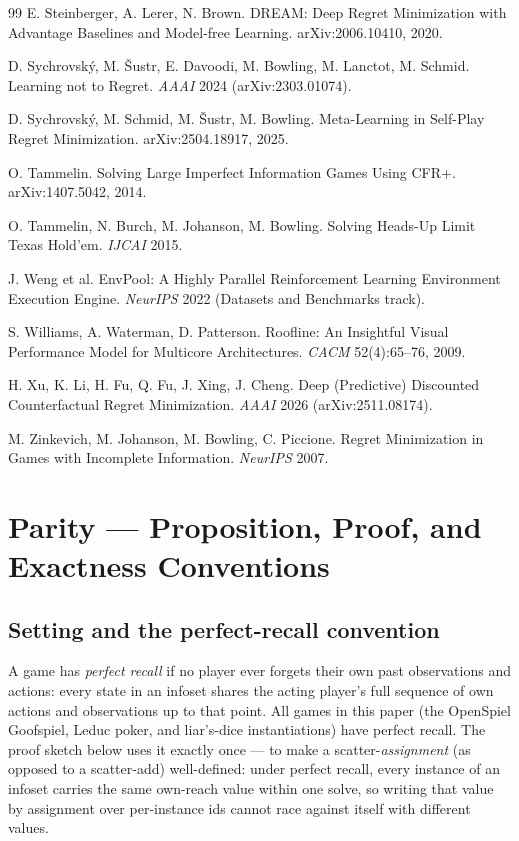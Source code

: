 \documentclass[11pt]{article}
\begin{document}
\begin{thebibliography}{99}
 E. Steinberger, A. Lerer, N. Brown. DREAM: Deep Regret
Minimization with Advantage Baselines and Model-free Learning. arXiv:2006.10410, 2020.

 D. Sychrovský, M. Šustr, E. Davoodi, M. Bowling, M. Lanctot,
M. Schmid. Learning not to Regret. \emph{AAAI} 2024 (arXiv:2303.01074).

 D. Sychrovský, M. Schmid, M. Šustr, M. Bowling. Meta-Learning in
Self-Play Regret Minimization. arXiv:2504.18917, 2025.

 O. Tammelin. Solving Large Imperfect Information Games Using
CFR+. arXiv:1407.5042, 2014.

 O. Tammelin, N. Burch, M. Johanson, M. Bowling. Solving Heads-Up
Limit Texas Hold'em. \emph{IJCAI} 2015.

 J. Weng et al. EnvPool: A Highly Parallel Reinforcement Learning
Environment Execution Engine. \emph{NeurIPS} 2022 (Datasets and Benchmarks track).

 S. Williams, A. Waterman, D. Patterson. Roofline: An Insightful
Visual Performance Model for Multicore Architectures. \emph{CACM} 52(4):65--76, 2009.

 H. Xu, K. Li, H. Fu, Q. Fu, J. Xing, J. Cheng. Deep
(Predictive) Discounted Counterfactual Regret Minimization. \emph{AAAI} 2026
(arXiv:2511.08174).

 M. Zinkevich, M. Johanson, M. Bowling, C. Piccione. Regret
Minimization in Games with Incomplete Information. \emph{NeurIPS} 2007.

\end{thebibliography}


\appendix

\section{Parity --- Proposition, Proof, and Exactness Conventions}

\subsection{Setting and the perfect-recall convention}

A game has \emph{perfect recall} if no player ever forgets their own past observations
and actions: every state in an infoset shares the acting player's full sequence of own
actions and observations up to that point. All games in this paper (the OpenSpiel
Goofspiel, Leduc poker, and liar's-dice instantiations) have perfect recall. The proof
sketch below uses it exactly once --- to make a scatter-\emph{assignment} (as opposed to
a scatter-add) well-defined: under perfect recall, every instance of an infoset carries
the same own-reach value within one solve, so writing that value by assignment over
per-instance ids cannot race against itself with different values.
\end{document}
